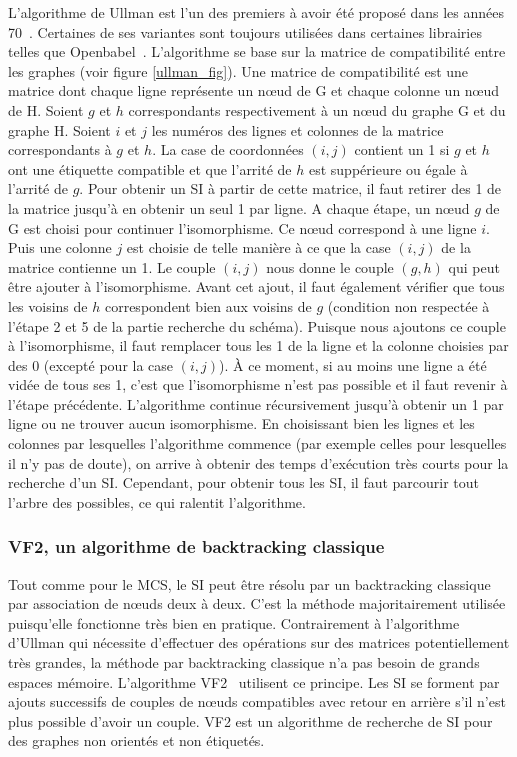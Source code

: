 L'algorithme de Ullman est l'un des premiers à avoir été proposé dans les années 70~\cite{ullmann_algorithm_1976}.
Certaines de ses variantes sont toujours utilisées dans certaines librairies telles que Openbabel~\cite{oboyle_open_2011}.
L'algorithme se base sur la matrice de compatibilité entre les graphes (voir figure \ref{ullman_fig}).
Une matrice de compatibilité est une matrice dont chaque ligne représente un n\oe{}ud de G et chaque colonne un n\oe{}ud de H.
Soient $g$ et $h$ correspondants respectivement à un n\oe{}ud du graphe G et du graphe H.
Soient $i$ et $j$ les numéros des lignes et colonnes de la matrice correspondants à $g$ et $h$.
La case de coordonnées $(i,j)$ contient un 1 si $g$ et $h$ ont une étiquette compatible et que l'arrité de $h$ est suppérieure ou égale à l'arrité de $g$.
Pour obtenir un SI à partir de cette matrice, il faut retirer des 1 de la matrice jusqu'à en obtenir un seul 1 par ligne.
A chaque étape, un n\oe{}ud $g$ de G est choisi pour continuer l'isomorphisme.
Ce n\oe{}ud correspond à une ligne $i$.
Puis une colonne $j$ est choisie de telle manière à ce que la case $(i,j)$ de la matrice contienne un 1.
Le couple $(i,j)$ nous donne le couple $(g,h)$ qui peut être ajouter à l'isomorphisme.
Avant cet ajout, il faut également vérifier que tous les voisins de $h$ correspondent bien aux voisins de $g$ (condition non respectée à l'étape 2 et 5 de la partie recherche du schéma).
Puisque nous ajoutons ce couple à l'isomorphisme, il faut remplacer tous les 1 de la ligne et la colonne choisies par des 0 (excepté pour la case $(i,j)$).
À ce moment, si au moins une ligne a été vidée de tous ses 1, c'est que l'isomorphisme n'est pas possible et il faut revenir à l'étape précédente.
L'algorithme continue récursivement jusqu'à obtenir un 1 par ligne ou ne trouver aucun isomorphisme.
En choisissant bien les lignes et les colonnes par lesquelles l'algorithme commence (par exemple celles pour lesquelles il n'y pas de doute), on arrive à obtenir des temps d'exécution très courts pour la recherche d'un SI.
Cependant, pour obtenir tous les SI, il faut parcourir tout l'arbre des possibles, ce qui ralentit l'algorithme.


\subsubsection{VF2, un algorithme de backtracking classique}

Tout comme pour le MCS, le SI peut être résolu par un backtracking classique par association de n\oe{}uds deux à deux.
C'est la méthode majoritairement utilisée puisqu'elle fonctionne très bien en pratique.
Contrairement à l'algorithme d'Ullman qui nécessite d'effectuer des opérations sur des matrices potentiellement très grandes, la méthode par backtracking classique n'a pas besoin de grands espaces mémoire.
L'algorithme VF2~\cite{cordella_subgraph_2004} utilisent ce principe.
Les SI se forment par ajouts successifs de couples de n\oe{}uds compatibles avec retour en arrière s'il n'est plus possible d'avoir un couple.
VF2 est un algorithme de recherche de SI pour des graphes non orientés et non étiquetés.

